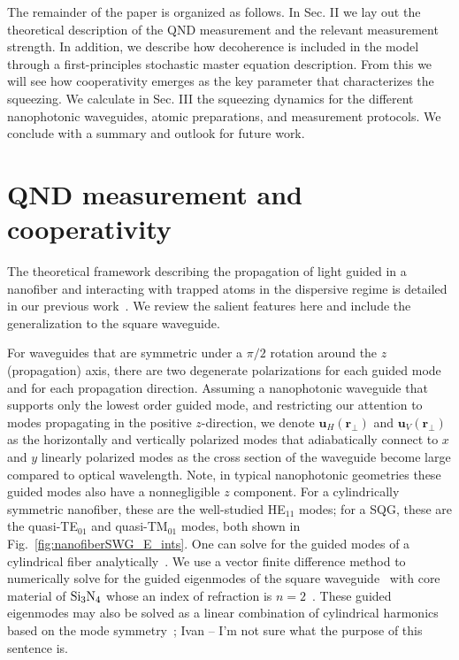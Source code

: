 \documentclass[preprint,aps,pra,onecolumn,superscriptaddress]{revtex4-1} %
\newcommand{\mbf}[1]{\mathbf{#1}}
\begin{document}
The remainder of the paper is organized as follows.  In Sec. II we lay out the theoretical description of the QND measurement and the relevant measurement strength.  In addition, we describe how decoherence is included in the model through a first-principles stochastic master equation description.  From this we will see how cooperativity emerges as the key parameter that characterizes the squeezing.  We calculate in Sec. III the squeezing dynamics for the different nanophotonic waveguides, atomic preparations, and measurement protocols.  We conclude with a summary and outlook for future work.


\section{QND measurement and cooperativity} \label{Sec::QNDandCooperativityTheory}
The theoretical framework describing the propagation of light guided in a nanofiber and interacting with trapped atoms in the dispersive regime is detailed in our previous work~\cite{Qi2016}.  We review the salient features here and include the generalization to the square waveguide.

For waveguides that are symmetric under a $\pi/2$ rotation around the $z$ (propagation) axis, there are two degenerate polarizations for each guided mode and for each propagation direction.  Assuming a nanophotonic waveguide that supports only the lowest order guided mode, and restricting our attention to modes propagating in the positive $z$-direction, we denote $\mbf{u}_H(\mbf{r}_\perp)$ and  $\mbf{u}_V(\mbf{r}_\perp)$ as the horizontally and vertically polarized modes that adiabatically connect to $x$ and $y$ linearly polarized modes as the cross section of the waveguide become large compared to optical wavelength.  Note, in typical nanophotonic geometries these guided modes also have a nonnegligible $z$ component.  For a cylindrically symmetric nanofiber, these are the well-studied HE$_{11}$ modes; for a SQG, these are the quasi-TE$_{01}$ and quasi-TM$_{01}$ modes, both shown in Fig.~\eqref{fig:nanofiberSWG_E_ints}. One can solve for the guided modes of a cylindrical fiber analytically~\cite{Kien2004,Vetsch2010Opticala,Qi2016}. We use a vector finite difference method to numerically solve for the guided eigenmodes of the square waveguide~\cite{Fallahkhair2008} with core material of $ \rm{Si}_3\rm{N}_4 $ whose an index of refraction is $ n=2 $~\cite{Lee2013}. 
{\color{red} These guided eigenmodes may also be solved as a linear combination of cylindrical harmonics based on the mode symmetry~\cite{Pavlovic2010Dispersion};  Ivan -- I'm not sure what the purpose of this sentence is.}
\end{document}
